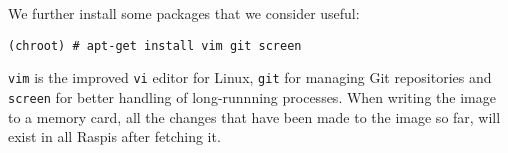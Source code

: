 We further install some packages that we consider useful:
\begin{lstlisting}[]
(chroot) # apt-get install vim git screen
\end{lstlisting}
\FloatBarrier
\vspace{-5mm}

\texttt{vim} is the improved \texttt{vi} editor for Linux, \texttt{git}
for managing Git repositories and \texttt{screen} for better handling of
long-runnning processes. When writing the image to a memory card, all the
changes that have been made to the image so far, will exist in all
\ac{Raspi}s after fetching it.